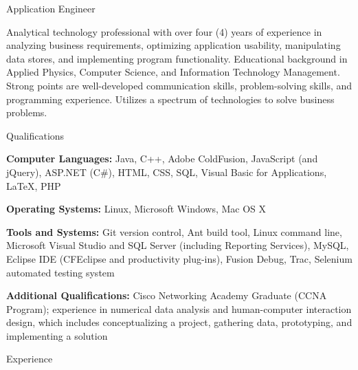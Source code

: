 



\begin{Large}\textsf{Application Engineer}\end{Large} \vspace{-2mm}

\begin{itemize1}
	\item Analytical technology professional with over four (4) years of experience in analyzing business requirements, optimizing application usability, manipulating data stores, and implementing program functionality.  Educational background in Applied Physics, Computer Science, and Information Technology Management. Strong points are well-developed communication skills, problem-solving skills, and programming experience. Utilizes a spectrum of technologies to solve business problems.
\end{itemize1}

\begin{Large}\textsf{Qualifications}\end{Large} \vspace{-2mm}

\begin{itemize1}
	\item \textbf{Computer Languages:} Java, C++, Adobe ColdFusion, JavaScript (and jQuery), ASP.NET (C\#), HTML, CSS, SQL, Visual Basic for Applications, \LaTeX, PHP \vspace{2mm}
	\item \textbf{Operating Systems:} Linux, Microsoft Windows, Mac OS X \vspace{2mm}
	\item \textbf{Tools and Systems:} Git version control, Ant build tool, Linux command line, Microsoft Visual Studio and SQL Server (including Reporting Services), MySQL, Eclipse IDE (CFEclipse and productivity plug-ins), Fusion Debug, Trac, Selenium automated testing system \vspace{2mm}
	\item \textbf{Additional Qualifications:} Cisco Networking Academy Graduate (CCNA Program); experience in numerical data analysis and human-computer interaction design, which includes conceptualizing a project, gathering data, prototyping, and implementing a solution
\end{itemize1}

\begin{Large}\textsf{Experience}\end{Large} \vspace{-2mm}

